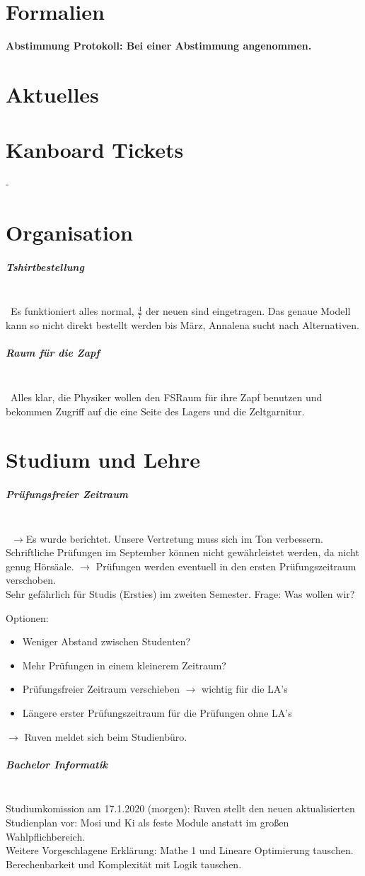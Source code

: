 \documentclass[]{article}
\begin{document}
\section{Formalien}
\textbf{Abstimmung Protokoll: Bei einer Abstimmung angenommen.}
\section{Aktuelles}



\section{Kanboard Tickets}
-
\section{Organisation}
\subparagraph{Tshirtbestellung}\ \\ \
Es funktioniert alles normal, $\frac{4}{7}$ der neuen sind eingetragen.
Das genaue Modell kann so nicht direkt bestellt werden bis März, Annalena sucht nach Alternativen.
\subparagraph{Raum für die Zapf}\ \\ \
Alles klar, die Physiker wollen den FSRaum für ihre Zapf benutzen und bekommen Zugriff auf die eine Seite des Lagers und die Zeltgarnitur.
\section{Studium und Lehre}
\subparagraph{Prüfungsfreier Zeitraum}\ \\ \
$\rightarrow$Es wurde berichtet. Unsere Vertretung muss sich im Ton verbessern. \\
Schriftliche Prüfungen im September können nicht gewährleistet werden, da nicht genug Hörsäale.
$\rightarrow$ Prüfungen werden eventuell in den ersten Prüfungszeitraum verschoben.\\ Sehr gefährlich für Studis (Ersties) im zweiten Semester. 
Frage: Was wollen wir? 

Optionen:
\begin{itemize}
\item Weniger Abstand zwischen Studenten? 
\item Mehr Prüfungen in einem kleinerem Zeitraum?
\item Prüfungsfreier Zeitraum verschieben $\rightarrow$ wichtig für die LA's
\item Längere erster Prüfungszeitraum für die Prüfungen ohne LA's
 \end{itemize}
$\rightarrow$ Ruven meldet sich beim Studienbüro.
\subparagraph{Bachelor Informatik}\ \\
Studiumkomission am 17.1.2020 (morgen):
Ruven stellt den neuen aktualisierten Studienplan vor: Mosi und Ki als feste Module anstatt im großen Wahlpflichbereich.\\
Weitere Vorgeschlagene Erklärung: Mathe 1 und Lineare Optimierung tauschen. Berechenbarkeit und Komplexität mit Logik tauschen.
\end{document}
